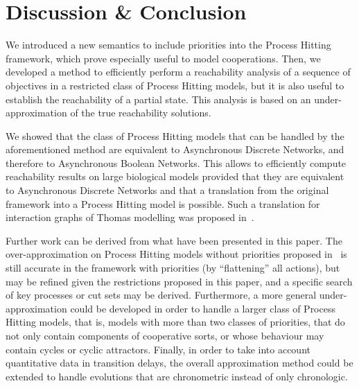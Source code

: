 \section{Discussion \& Conclusion}\label{sec:ccl}

We introduced a new semantics to include priorities into the Process Hitting framework, which prove especially useful to model cooperations.
Then, we developed a method to efficiently perform a reachability analysis of a sequence of objectives in a restricted class of Process Hitting models,
but it is also useful to establish the reachability of a partial state.
This analysis is based on an under-approximation of the true reachability solutions.

We showed that the class of Process Hitting models that can be handled by the aforementioned method are equivalent to Asynchronous Discrete Networks, and therefore to Asynchronous Boolean Networks.
This allows to efficiently compute reachability results on large biological models provided that they are equivalent to Asynchronous Discrete Networks and that a translation from the original framework into a Process Hitting model is possible.
Such a translation for interaction graphs of Thomas modelling was proposed in~\cite{PMR10-TCSB}. %

Further work can be derived from what have been presented in this paper.
The over-approximation on Process Hitting models without priorities proposed in~\cite{PMR12-MSCS}
is still accurate in the framework with priorities (by “flattening” all actions),
but may be refined given the restrictions proposed in this paper,
and a specific search of key processes or cut sets may be derived.
Furthermore, a more general under-approximation could be developed in order to handle a larger class of Process Hitting models, that is,
models with more than two classes of priorities, that do not only contain components of cooperative sorts, or whose behaviour may contain cycles or cyclic attractors.
Finally, in order to take into account quantitative data in transition delays, the overall approximation method could be extended to handle evolutions that are chronometric instead of only chronologic.
